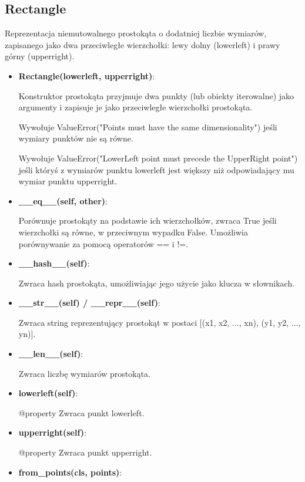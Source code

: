 \documentclass{lab}
\begin{document}
\subsection{Rectangle}
Reprezentacja niemutowalnego prostokąta o dodatniej liczbie wymiarów, zapisanego jako dwa przeciwległe wierzchołki: lewy dolny (lowerleft) i prawy górny (upperright).
\begin{itemize}
  \item \textbf{Rectangle(lowerleft, upperright)}:
  
  Konstruktor prostokąta przyjmuje dwa punkty (lub obiekty iterowalne) jako argumenty i zapisuje je jako przeciwległe wierzchołki prostokąta.

  Wywołuje ValueError("Points must have the same dimensionality") jeśli wymiary punktów nie są równe.

  Wywołuje ValueError("LowerLeft point must precede the UpperRight point") jeśli któryś z wymiarów punktu lowerleft jest większy niż odpowiadający mu wymiar punktu upperright.

  \item \textbf{\_\_eq\_\_(self, other)}:
  
  Porównuje prostokąty na podstawie ich wierzchołków, zwraca True jeśli wierzchołki są równe, w przeciwnym wypadku False. Umożliwia porównywanie za pomocą operatorów == i !=.

  \item \textbf{\_\_hash\_\_(self)}:
  
  Zwraca hash prostokąta, umożliwiając jego użycie jako klucza w słownikach.

  \item \textbf{\_\_str\_\_(self) / \_\_repr\_\_(self)}:
  
  Zwraca string reprezentujący prostokąt w postaci [(x1, x2, ..., xn), (y1, y2, ..., yn)].

  \item \textbf{\_\_len\_\_(self)}:
  
  Zwraca liczbę wymiarów prostokąta.

  \item \textbf{lowerleft(self)}:
  
  @property Zwraca punkt lowerleft.

  \item \textbf{upperright(self)}:
  
  @property Zwraca punkt upperright.

  \item \textbf{from\_points(cls, points)}:
  

\end{itemize}
\end{document}

